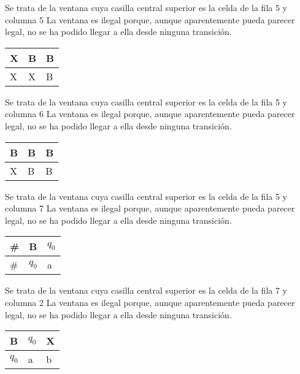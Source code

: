 ﻿\documentclass[a4paper,10pt]{article}
\begin{document}
Se trata de la ventana cuya casilla central superior es la celda de la fila 5 y columna 5\newline
La ventana es ilegal porque, aunque aparentemente pueda parecer legal, no se ha podido llegar a ella desde ninguna transición.\newline
\begin{table}[h!]
\centering
\begin{tabular}{|l|l|l|}
\hline
	X   &   B   &   B	\\ \hline
	X   &   X   &   B	\\ \hline
\end{tabular}
\end{table}

Se trata de la ventana cuya casilla central superior es la celda de la fila 5 y columna 6\newline
La ventana es ilegal porque, aunque aparentemente pueda parecer legal, no se ha podido llegar a ella desde ninguna transición.\newline
\begin{table}[h!]
\centering
\begin{tabular}{|l|l|l|}
\hline
	B   &   B   &   B	\\ \hline
	X   &   B   &   B	\\ \hline
\end{tabular}
\end{table}

Se trata de la ventana cuya casilla central superior es la celda de la fila 5 y columna 7\newline
La ventana es ilegal porque, aunque aparentemente pueda parecer legal, no se ha podido llegar a ella desde ninguna transición.\newline
\begin{table}[h!]
\centering
\begin{tabular}{|l|l|l|}
\hline
	\#  &   B   &   $q_0$	\\ \hline
	\#  &   $q_0$  &   a	\\ \hline
\end{tabular}
\end{table}

Se trata de la ventana cuya casilla central superior es la celda de la fila 7 y columna 2\newline
La ventana es ilegal porque, aunque aparentemente pueda parecer legal, no se ha podido llegar a ella desde ninguna transición.\newline
\begin{table}[h!]
\centering
\begin{tabular}{|l|l|l|}
\hline
	B   &   $q_0$  &   X	\\ \hline
	$q_0$  &   a   &   b	\\ \hline
\end{tabular}
\end{table}
\end{document}
